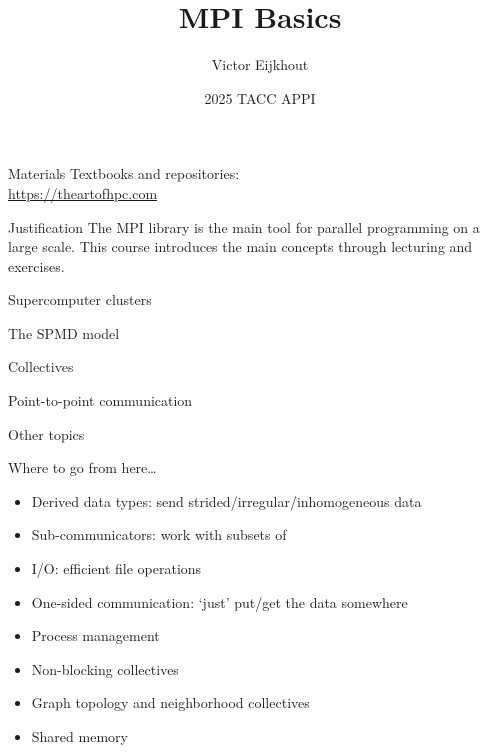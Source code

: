 \documentclass[11pt]{beamer}
\begin{document}
\author[Eijkhout]{Victor Eijkhout}
\date[2025]{2025 TACC APPI}
\title[MPI]{MPI Basics}
\maketitle

\begin{frame}[containsverbatim]{Materials}
    Textbooks and repositories:\\
    \url{https://theartofhpc.com}
\end{frame}

\begin{frame}{Justification}
  The MPI library is the main tool
  for parallel programming on a large scale.
  This course introduces the main concepts
  through lecturing and exercises.
\end{frame}



 {Supercomputer clusters}


 {The SPMD model}
\label{sec:spmd}


 {Collectives}
\label{sec:collectives}


 {Point-to-point communication}



 {Other topics}

\begin{numberedframe}{Where to go from here\ldots}
  \begin{itemize}
  \item Derived data types: send strided/irregular/inhomogeneous data
  \item Sub-communicators: work with subsets of 
  \item I/O: efficient file operations
  \item One-sided communication: `just' put/get the data somewhere
  \item Process management
  \item Non-blocking collectives
  \item Graph topology and neighborhood collectives
  \item Shared memory
  \end{itemize}
\end{numberedframe}



\end{document}
